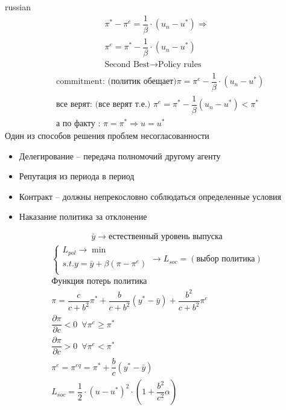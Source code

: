 \documentclass{article}
\begin{document}
\begin{otherlanguage*}{russian}
\begin{align*}
\pi^* - \pi^e = \dfrac{1}{\beta} \cdot (u_n - u^*) \Rightarrow \\ \pi^e = \pi^* - \dfrac{1}{\beta} \cdot (u_n - u^* ) \\
\text{Second Best} \rightarrow \text{Policy rules }  
\end{align*}
\begin{align*}
& \text{commitment: (политик обещает)} \pi = \pi^e - \dfrac{1}{\beta} \cdot (u_n - u^* ) \\
& \text{все верят: (все верят т.е.) }  \pi^e = \pi^* - \dfrac{1}{\beta} (u_n - u^* ) < \pi^* \\
& \text{а по факту : } \pi = \pi^* \Rightarrow u = u ^* 
\end{align*}
Один из способов решения проблем несогласованности
\begin{itemize}
\item Делегирование -- передача полномочий другому агенту
\item Репутация из периода в период
\item Контракт -- должны непрекословно соблюдаться определенные условия 
\item Наказание политика за отклонение 
\end{itemize}
\begin{align*}
\bar{y} \rightarrow \text{естественный уровень выпуска} 
\end{align*}
\begin{align*}
\begin{cases}
L_{pol} \rightarrow \min \\
s.t. y = \bar{y} + \beta(\pi - \pi^e) \\
\end{cases} \rightarrow L_{soc}  = (\text{выбор политика}) \\
\text{Функция потерь политика} \\
\pi = \dfrac{c}{c + b^2} \pi^* + \dfrac{b}{c + b ^ 2 } (y ^* - \bar{y}) + \dfrac{b^2}{c + b ^2 } \pi^e \\
\dfrac{\partial \pi}{\partial c} < 0 \,\,\, \forall \pi^e \ge \pi^* \\
\dfrac{\partial \pi}{\partial c} > 0 \,\,\, \forall \pi^e < \pi^*  \\
\pi^e = \pi^{eq} = \pi^* + \dfrac{b}{c} (y^* - \bar{y}) \\
L_{soc} = \dfrac{1}{2} \cdot (u - u^* ) ^2 \cdot (1 + \dfrac{b^2}{c^2} \alpha)  
\end{align*}

\end{otherlanguage*}
\end{document}
